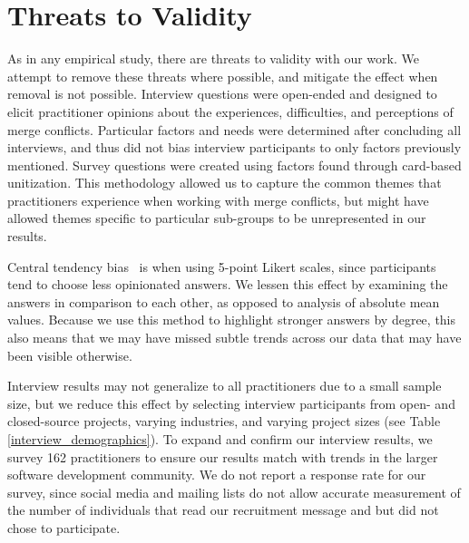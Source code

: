 \section{Threats to Validity}\label{threats}
As in any empirical study, there are threats to validity with our work.
We attempt to remove these threats where possible, and mitigate the effect when removal is not possible.
Interview questions were open-ended and designed to elicit practitioner opinions about the experiences, difficulties, and perceptions of merge conflicts.
Particular factors and needs were determined after concluding all interviews, and thus did not bias interview participants to only factors previously mentioned.
Survey questions were created using factors found through card-based unitization.
This methodology allowed us to capture the common themes that practitioners experience when working with merge conflicts, but might have allowed themes specific to particular sub-groups to be unrepresented in our results.

Central tendency bias~\cite{guilford1954psychometric} is when using 5-point Likert scales, since participants tend to choose less opinionated answers.
We lessen this effect by examining the answers in comparison to each other, as opposed to analysis of absolute mean values.
Because we use this method to highlight stronger answers by degree, this also means that we may have missed subtle trends across our data that may have been visible otherwise.

Interview results may not generalize to all practitioners due to a small sample size, but we reduce this effect by selecting interview participants from open- and closed-source projects, varying industries, and varying project sizes (see Table \ref{interview_demographics}).
To expand and confirm our interview results, we survey 162 practitioners to ensure our results match with trends in the larger software development community.
We do not report a response rate for our survey, since social media and mailing lists do not allow accurate measurement of the number of individuals that read our recruitment message and but did not chose to participate.




